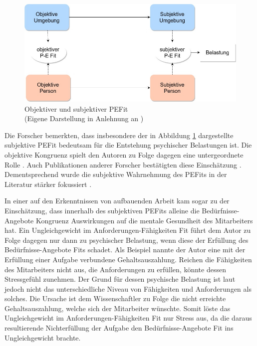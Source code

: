 \begin{figure}[h]
	\centering
	\includegraphics[width=1\textwidth]{gfx/subjektivObjektivPEFit.jpg}
	\caption[Objektiver und subjektiver \acs{PEFit}]{Objektiver und subjektiver \acs{PEFit}\\
	(Eigene Darstellung in Anlehnung an \cite[S. 22]{edwards:2008})}
	\label{fig:personEnvironmentFit:subjektivObjektiv:abb1}
\end{figure}

Die Forscher bemerkten, dass insbesondere der in Abbildung \ref{fig:personEnvironmentFit:subjektivObjektiv:abb1} dargestellte subjektive \ac{PEFit} bedeutsam für die Entstehung psychischer Belastungen ist. Die objektive Kongruenz spielt den Autoren zu Folge dagegen eine untergeordnete Rolle \cite[S. 4]{copingAndAdaption:1974}. Auch Publikationen anderer Forscher bestätigten diese Einschätzung \cite[S. 3]{carless:2005}. Dementsprechend wurde die subjektive Wahrnehmung des \acp{PEFit} in der Literatur stärker fokussiert \cite[S. 8]{caplan:1987}\cite[S. 9]{caplan:1993}\cite[S. 16]{choi:2004}.

In einer auf den Erkenntnissen von \textcite[S. 1ff.]{copingAndAdaption:1974} aufbauenden Arbeit kam \textcite[S. 5ff.]{harrison:1978} sogar zu der Einschätzung, dass innerhalb des subjektiven \acp{PEFit} alleine die Bedürfnisse-Angebote Kongruenz Auswirkungen auf die mentale Gesundheit des Mitarbeiters hat. Ein Ungleichgewicht im Anforderungen-Fähigkeiten Fit führt dem Autor zu Folge dagegen nur dann zu psychischer Belastung, wenn diese der Erfüllung des Bedürfnisse-Angebote Fits schadet. Als Beispiel nannte der Autor eine mit der Erfüllung einer Aufgabe verbundene Gehaltsauszahlung. Reichen die Fähigkeiten des Mitarbeiters nicht aus, die Anforderungen zu erfüllen, könnte dessen Stressgefühl zunehmen. Der Grund für dessen psychische Belastung ist laut \textcite[S. 7f.]{harrison:1978} jedoch nicht das unterschiedliche Niveau von Fähigkeiten und Anforderungen als solches. Die Ursache ist dem Wissenschaftler zu Folge die nicht erreichte Gehaltsauszahlung, welche sich der Mitarbeiter wünschte. Somit löste das Ungleichgewicht im Anforderungen-Fähigkeiten Fit nur Stress aus, da die daraus resultierende Nichterfüllung der Aufgabe den Bedürfnisse-Angebote Fit ins Ungleichgewicht brachte.


